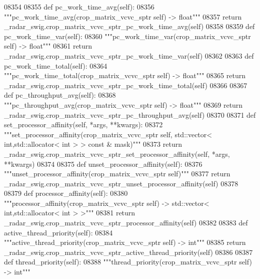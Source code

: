 \begin{DoxyCode}
{{{{{{{{{{{{{{{{{{{{{{{{{{{08354 
08355     \textcolor{keyword}{def }pc_work_time_avg(self):
08356         \textcolor{stringliteral}{"""pc\_work\_time\_avg(crop\_matrix\_vcvc\_sptr self) -> float"""}
08357         \textcolor{keywordflow}{return} \_radar\_swig.crop\_matrix\_vcvc\_sptr\_pc\_work\_time\_avg(self)
08358 
08359     \textcolor{keyword}{def }pc_work_time_var(self):
08360         \textcolor{stringliteral}{"""pc\_work\_time\_var(crop\_matrix\_vcvc\_sptr self) -> float"""}
08361         \textcolor{keywordflow}{return} \_radar\_swig.crop\_matrix\_vcvc\_sptr\_pc\_work\_time\_var(self)
08362 
08363     \textcolor{keyword}{def }pc_work_time_total(self):
08364         \textcolor{stringliteral}{"""pc\_work\_time\_total(crop\_matrix\_vcvc\_sptr self) -> float"""}
08365         \textcolor{keywordflow}{return} \_radar\_swig.crop\_matrix\_vcvc\_sptr\_pc\_work\_time\_total(self)
08366 
08367     \textcolor{keyword}{def }pc_throughput_avg(self):
08368         \textcolor{stringliteral}{"""pc\_throughput\_avg(crop\_matrix\_vcvc\_sptr self) -> float"""}
08369         \textcolor{keywordflow}{return} \_radar\_swig.crop\_matrix\_vcvc\_sptr\_pc\_throughput\_avg(self)
08370 
08371     \textcolor{keyword}{def }set_processor_affinity(self, *args, **kwargs):
08372         \textcolor{stringliteral}{"""set\_processor\_affinity(crop\_matrix\_vcvc\_sptr self, std::vector< int,std::allocator< int > >
       const & mask)"""}
08373         \textcolor{keywordflow}{return} \_radar\_swig.crop\_matrix\_vcvc\_sptr\_set\_processor\_affinity(self, *args, **kwargs)
08374 
08375     \textcolor{keyword}{def }unset_processor_affinity(self):
08376         \textcolor{stringliteral}{"""unset\_processor\_affinity(crop\_matrix\_vcvc\_sptr self)"""}
08377         \textcolor{keywordflow}{return} \_radar\_swig.crop\_matrix\_vcvc\_sptr\_unset\_processor\_affinity(self)
08378 
08379     \textcolor{keyword}{def }processor_affinity(self):
08380         \textcolor{stringliteral}{"""processor\_affinity(crop\_matrix\_vcvc\_sptr self) -> std::vector< int,std::allocator< int > >"""}
08381         \textcolor{keywordflow}{return} \_radar\_swig.crop\_matrix\_vcvc\_sptr\_processor\_affinity(self)
08382 
08383     \textcolor{keyword}{def }active_thread_priority(self):
08384         \textcolor{stringliteral}{"""active\_thread\_priority(crop\_matrix\_vcvc\_sptr self) -> int"""}
08385         \textcolor{keywordflow}{return} \_radar\_swig.crop\_matrix\_vcvc\_sptr\_active\_thread\_priority(self)
08386 
08387     \textcolor{keyword}{def }thread_priority(self):
08388         \textcolor{stringliteral}{"""thread\_priority(crop\_matrix\_vcvc\_sptr self) -> int"""}
}}}}}}}}}}}}}}}}}}}}}}}}}}}
\end{DoxyCode}
